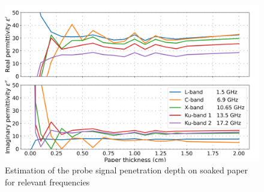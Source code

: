 

\begin{figure}[ht!]
    \centering  
    \includegraphics[width=\columnwidth]{Images/wet-paper.png}
    \caption[]{Estimation of the probe signal penetration depth on soaked paper for relevant frequencies}\label{fig:wet-paper}
\end{figure}

